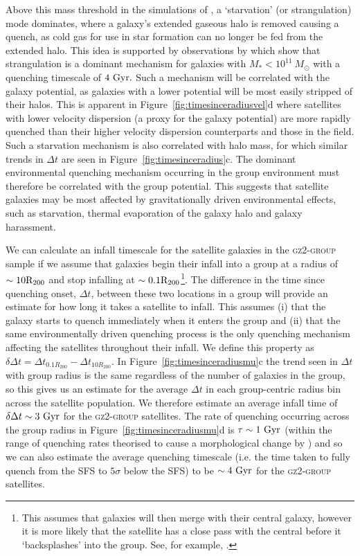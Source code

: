 \documentclass[useAMS,usenatbib]{mn2e}
\begin{document}
Above this mass threshold in the simulations of \cite{fillingham16}, a `starvation' (or strangulation) mode \citep{larson80, balogh00} dominates, where a galaxy's extended gaseous halo is removed causing a quench, as cold gas for use in star formation can no longer be fed from the extended halo. This idea is supported by observations by \citet{peng10} which show that strangulation is a dominant mechanism for galaxies with $M_* < 10^{11}~M_{\odot}$ with a quenching timescale of $4~\rm{Gyr}.$ Such a mechanism will be correlated with the galaxy potential, as galaxies with a lower potential will be most easily stripped of their halos. This is apparent in Figure~\ref{fig:timesinceradiusvel}d where satellites with lower velocity dispersion (a proxy for the galaxy potential) are more rapidly quenched than their higher velocity dispersion counterparts and those in the field. Such a starvation mechanism is also correlated with halo mass, for which similar trends in $\Delta t$ are seen in Figure~\ref{fig:timesinceradius}c. The dominant environmental quenching mechanism occurring in the group environment must therefore be correlated with the group potential. This suggests that satellite galaxies may be most affected by gravitationally driven environmental effects, such as starvation, thermal evaporation of the galaxy halo and galaxy harassment. 


We can calculate an infall timescale for the satellite galaxies in the \textsc{gz2-group} sample if we assume that galaxies begin their infall into a group at a radius of $\sim10\rm{R}_{200}$ and stop infalling at $\sim0.1\rm{R}_{200}$\footnote{This assumes that galaxies will then merge with their central galaxy, however it is more likely that the satellite has a close pass with the central before it `backsplashes' into the group. See, for example, \cite{pimbblet11}.}. The difference in the time since quenching onset, $\Delta t$, between these two locations in a group will provide an estimate for how long it takes a satellite to infall. This assumes (i) that the galaxy starts to quench immediately when it enters the group and (ii) that the same environmentally driven quenching process is the only quenching mechanism affecting the satellites throughout their infall. We define this property as $\delta \Delta t = \Delta t_{0.1R_{200}} - \Delta t_{10 R_{200}}$. In Figure~\ref{fig:timesinceradiusmu}c the trend seen in $\Delta t$ with group radius is the same regardless of the number of galaxies in the group, so this gives us an estimate for the average $\Delta t$ in each group-centric radius bin across the satellite population. We therefore estimate an average infall time of $\delta \Delta t \sim 3 ~\rm{Gyr}$ for the \textsc{gz2-group} satellites. The rate of quenching occurring across the group radius in Figure~\ref{fig:timesinceradiusmu}d is $\tau \sim 1~\rm{Gyr}$ (within the range of quenching rates theorised to cause a morphological change by \citealt{smethurst15}) and so we can also estimate the average quenching timescale (i.e. the time taken to fully quench from the SFS to $5\sigma$ below the SFS) to be $\sim 4~\rm{Gyr}$ for the \textsc{gz2-group} satellites.
\end{document}
